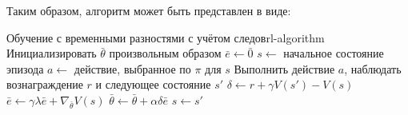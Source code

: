 Таким образом, алгоритм может быть представлен в виде:

\begin{alg}{Обучение с временными разностями с учётом следов}{rl-algorithm}
    \State Инициализировать $\bar{\theta}$ произвольным образом
        \State $\bar{e} \gets \bar{0}$
        \State $s \gets$ начальное состояние эпизода
            \State $a \gets$ действие, выбранное по $\pi$ для $s$
            \State Выполнить действие $a$, наблюдать вознаграждение $r$ и следующее состояние $s'$
            \State $\delta \gets r + \gamma V(s') - V(s)$
            \State $\bar{e} \gets \gamma \lambda \bar{e} + \nabla_{\bar{\theta}} V(s)$
            \State $\bar{\theta} \gets \bar{\theta} + \alpha \delta \bar{e}$
            \State $s \gets s'$
        \EndWhile
    \EndWhile
\end{alg}
